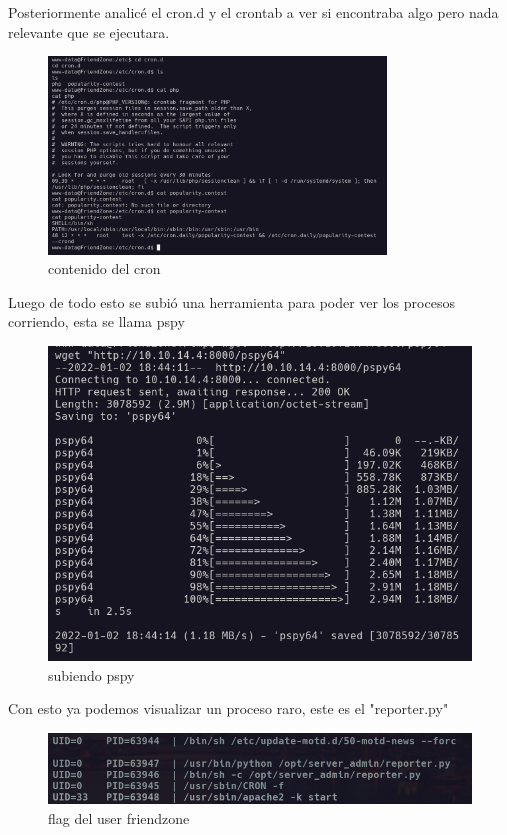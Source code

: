 \documentclass{article}
\begin{document}
Posteriormente analicé el cron.d y el crontab a ver si encontraba algo pero nada relevante que se ejecutara.

\begin{figure}[H]
	\center
	\includegraphics[width=0.8\textwidth]{images/friendzone/vistazo-cron.png}
	\caption{contenido del cron}
\end{figure}

Luego de todo esto se subió una herramienta para poder ver los procesos corriendo, esta se llama pspy

\begin{figure}[H]
	\center
	\includegraphics[width=\textwidth]{images/friendzone/obteniendo-pspy.png}
	\caption{subiendo pspy}
\end{figure}

Con esto ya podemos visualizar un proceso raro, este es el "reporter.py"

\begin{figure}[H]
	\center
	\includegraphics[width=\textwidth]{images/friendzone/reporter.png}
	\caption{flag del user friendzone}
\end{figure}
\end{document}
